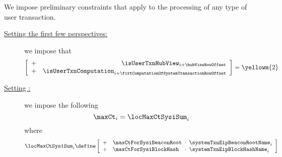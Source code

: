 \begin{center}
\end{center}
We impose preliminary constraints that apply to the processing of any type of user transaction.
\begin{description}
	\item[\underline{Setting the first few perspectives:}]
		we impose that
		\[
			\left[ \begin{array}{cr}
				+ & \isUserTxnHubView     _{i + \hubViewRowOffset                            } \\
				+ & \isUserTxnComputation _{i + \firtComputationOfSystemTransactionRowOffset } \\
			\end{array} \right]
			=
			\yellowm{2}
		\]
	\item[\underline{Setting \maxCt{}:}]
		we impose the following
		\[
			\maxCt _{i} = \locMaxCtSysiSum _{i}
		\]
		where
		\[
			\locMaxCtSysiSum _{i}
			\define
			\left[ \begin{array}{clcl}
				+ & \maxCtForSysiBeaconRoot & \!\!\!\cdot\!\!\! & \systemTxnEipBeaconRootName _{i} \\
				+ & \maxCtForSysiBlockHash  & \!\!\!\cdot\!\!\! & \systemTxnEipBlockHashName  _{i} \\
			\end{array} \right]
		\]
\end{description}
